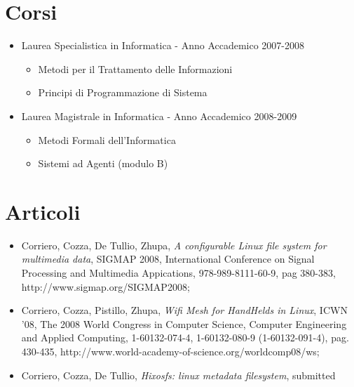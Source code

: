 \documentclass[a4paper,12pt]{article}
\begin{document}
\section*{Corsi}
\begin{itemize}
	\item Laurea Specialistica in Informatica - Anno Accademico 2007-2008
	\begin{itemize}
		\item Metodi per il Trattamento delle Informazioni
		\item Principi di Programmazione di Sistema
	\end{itemize}
	\item Laurea Magistrale in Informatica - Anno Accademico 2008-2009
	\begin{itemize}
		\item Metodi Formali dell'Informatica
		\item Sistemi ad Agenti (modulo B)
	\end{itemize}
\end{itemize}

\section*{Articoli}
\begin{itemize}
\item Corriero, Cozza, De Tullio, Zhupa, \textit{A configurable Linux file system for multimedia data}, SIGMAP 2008, International Conference on Signal Processing and Multimedia Appications, 978-989-8111-60-9, pag 380-383, \\http://www.sigmap.org/SIGMAP2008;
\item Corriero, Cozza, Pistillo, Zhupa, \textit{Wifi Mesh for HandHelds in Linux}, ICWN '08, The 2008 World Congress in Computer Science, Computer Engineering and Applied Computing, 1-60132-074-4, 1-60132-080-9 (1-60132-091-4), pag. 430-435, http://www.world-academy-of-science.org/worldcomp08/ws;
\item Corriero, Cozza, De Tullio, \textit{Hixosfs: linux metadata filesystem}, submitted
\end{itemize}
\end{document}
